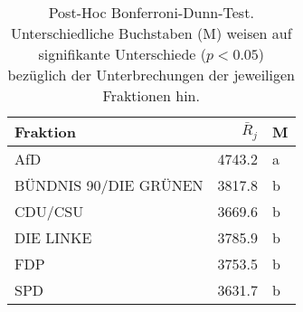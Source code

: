 \begin{table}[ht]
\centering
\begin{tabular}{lrl}
  \hline
Fraktion & $\bar{R}_{j}$ & M \\ 
  \hline
AfD & 4743.2 & a \\ 
  BÜNDNIS 90/DIE GRÜNEN & 3817.8 & b \\ 
  CDU/CSU & 3669.6 & b \\ 
  DIE LINKE & 3785.9 & b \\ 
  FDP & 3753.5 & b \\ 
  SPD & 3631.7 & b \\ 
   \hline
\end{tabular}
\caption[Post-Hoc Bonferroni-Dunn-Test Unterbrechungen]{Post-Hoc Bonferroni-Dunn-Test. Unterschiedliche Buchstaben (M) 
weisen auf signifikante Unterschiede ($p < 0.05$) bezüglich der Unterbrechungen der jeweiligen Fraktionen hin.} 
\label{table:dunn-test-unterbrechung}
\end{table}
